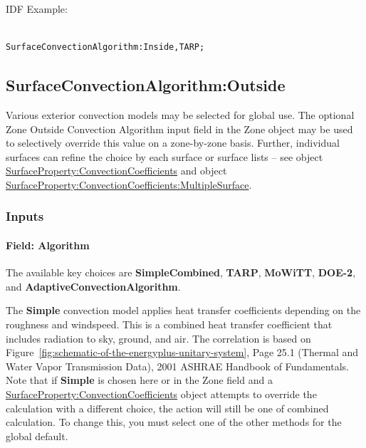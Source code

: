 IDF Example:

\begin{lstlisting}

SurfaceConvectionAlgorithm:Inside,TARP;
\end{lstlisting}

\subsection{SurfaceConvectionAlgorithm:Outside}\label{surfaceconvectionalgorithmoutside}

Various exterior convection models may be selected for global use. The optional Zone Outside Convection Algorithm input field in the Zone object may be used to selectively override this value on a zone-by-zone basis. Further, individual surfaces can refine the choice by each surface or surface lists -- see object \hyperref[surfacepropertyconvectioncoefficients]{SurfaceProperty:ConvectionCoefficients} and object \hyperref[surfacepropertyconvectioncoefficientsmultiplesurface]{SurfaceProperty:ConvectionCoefficients:MultipleSurface}.

\subsubsection{Inputs}\label{inputs-5-028}

\paragraph{Field: Algorithm}\label{field-algorithm-1-000}

The available key choices are \textbf{SimpleCombined}, \textbf{TARP}, \textbf{MoWiTT}, \textbf{DOE-2}, and \textbf{AdaptiveConvectionAlgorithm}.

The \textbf{Simple} convection model applies heat transfer coefficients depending on the roughness and windspeed. This is a combined heat transfer coefficient that includes radiation to sky, ground, and air. The correlation is based on Figure~\ref{fig:schematic-of-the-energyplus-unitary-system}, Page 25.1 (Thermal and Water Vapor Transmission Data), 2001 ASHRAE Handbook of Fundamentals. Note that if \textbf{Simple} is chosen here or in the Zone field and a \hyperref[surfacepropertyconvectioncoefficients]{SurfaceProperty:ConvectionCoefficients} object attempts to override the calculation with a different choice, the action will still be one of combined calculation. To change this, you must select one of the other methods for the global default.

